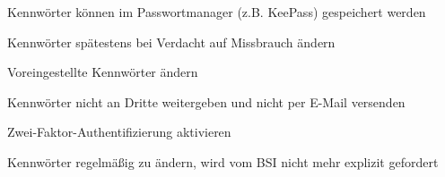 \item Kennwörter können im Passwortmanager (z.B. KeePass) gespeichert werden
\item Kennwörter spätestens bei Verdacht auf Missbrauch ändern
\item Voreingestellte Kennwörter ändern
\item Kennwörter nicht an Dritte weitergeben und nicht per E-Mail versenden
\item Zwei-Faktor-Authentifizierung aktivieren
\item Kennwörter regelmäßig zu ändern, wird vom BSI nicht mehr explizit gefordert